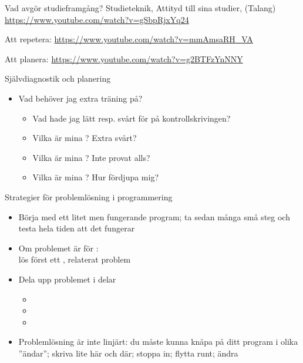 \begin{Slide}{Vad avgör studieframgång?}
Studieteknik, Attityd till sina studier, (Talang)
\url{https://www.youtube.com/watch?v=gSbpRjxYq24}

\vspace{2em} Att repetera:
\url{https://www.youtube.com/watch?v=mmAmsaRH_VA}

\vspace{2em} Att planera:
\url{https://www.youtube.com/watch?v=g2BTFzYnNNY}
\end{Slide}

\begin{Slide}{Självdiagnostik och planering}
\begin{itemize}
\item Vad behöver jag extra träning på?
\begin{itemize}
\item Vad hade jag lätt resp. svårt för på kontrollskrivingen?
\item Vilka är mina ? Extra svårt?
\item Vilka är mina ? Inte provat alls?
\item Vilka är mina ? Hur fördjupa mig?
\end{itemize}
\end{itemize}
\end{Slide}



\begin{Slide}{Strategier för problemlösning i programmering}
\begin{itemize}
\item Börja med ett litet men fungerande program; ta sedan många små steg och testa hela tiden att det fungerar
\item Om problemet är för :\\ lös först ett , relaterat problem
\item Dela upp problemet i delar
\begin{itemize}
\item {}
\item {}
\item {}
\end{itemize}
\item Problemlösning är inte linjärt: du måste kunna knåpa på ditt program i olika ''ändar''; skriva lite här och där; stoppa in; flytta runt; ändra
\end{itemize}
\end{Slide}

